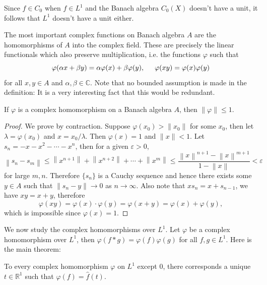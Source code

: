 Since $\widehat{f}\in C_0$ when $f\in L^1$ and the Banach algebra $C_0(X)$ doesn't have a unit, it follows that $L^1$ doesn't have a unit either.\par
The most important complex functions on Banach algebra $A$ are the homomorphisms of $A$ into the complex field. These are precisely the linear functionals which also preserve multiplication, i.e. the functions $\varphi$ such that 
$$\varphi(\alpha x+\beta y)=\alpha\varphi(x)+\beta\varphi(y),\hspace{0.5cm}\varphi(xy)=\varphi(x)\varphi(y)$$
for all $x,y\in A$ and $\alpha,\beta\in\mathbb{C}$. Note that no bounded assumption is made in the definition: It is a very interesting fact that this would be redundant.
\begin{theorem}
If $\varphi$ is a complex homomorphism on a Banach algebra $A$, then $\|\varphi\|\le 1$.
\end{theorem}
\begin{proof}
We prove by contraction. Suppose $\varphi(x_0)>\|x_0\|$ for some $x_0$, then let $\lambda=\varphi(x_0)$ and $x=x_0/\lambda$. Then $\varphi(x)=1$ and $\|x\|<1$. Let $s_n=-x-x^2-\cdots-x^n$, then for a given $\varepsilon>0$, 
$$
\left\| s_n-s_m \right\| \le \left\| x^{n+1} \right\| +\left\| x^{n+2} \right\| +\cdots +\left\| x^m \right\| \le \frac{\left\| x \right\| ^{n+1}-\left\| x \right\| ^{m+1}}{1-\left\| x \right\|}<\varepsilon 
$$
for large $m,n$. Therefore $\{s_n\}$ is a Cauchy sequence and hence there exists some $y\in A$ such that $\|s_n-y\|\to 0$ as $n\to\infty$. Also note that $xs_n=x+s_{n-1}$, we have $xy=x+y$, therefore 
$$
\varphi \left( xy \right) =\varphi \left( x \right) \cdot \varphi \left( y \right) =\varphi \left( x+y \right) =\varphi \left( x \right) +\varphi \left( y \right) ,
$$
which is impossible since $\varphi(x)=1$.
\end{proof}
We now study the complex homomorphisms over $L^1$. Let $\varphi$ be a complex homomorphism over $L^1$, then $\varphi(f*g)=\varphi(f)\varphi(g)$ for all $f,g\in L^1$. Here is the main theorem: 
\begin{theorem}
To every complex homomorphism $\varphi$ on $L^1$ except $0$, there corresponds a unique $t\in\mathbb{R}^1$ such that $\varphi(f)=\widehat{f}(t)$.
\end{theorem}
